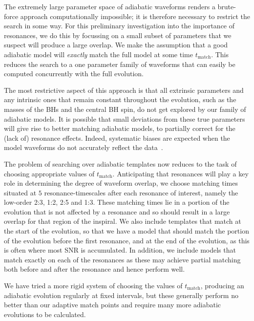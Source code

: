 \documentclass[aps,prd,amsfonts,amssymb,amsmath,nofootinbib,reprint,showpacs,superscriptaddress,twocolumn]{revtex4}
\begin{document}
The extremely large parameter space of adiabatic waveforms renders a brute-force approach computationally impossible; it is therefore necessary to restrict the search in some way. For this preliminary investigation into the importance of resonances, we do this by focussing on a small subset of parameters that we suspect will produce a large overlap. We make the assumption that a good adiabatic model will \emph{exactly} match the full model at some time $t_{\mathrm{match}}$. This reduces the search to a one parameter family of waveforms that can easily be computed concurrently with the full evolution.

The most restrictive aspect of this approach is that all extrinsic parameters and any intrinsic ones that remain constant throughout the evolution, such as the masses of the BHs and the central BH spin, do not get explored by our family of adiabatic models. It is possible that small deviations from these true parameters will give rise to better matching adiabatic models, to partially correct for the (lack of) resonance effects. Indeed, systematic biases are expected when the model waveforms do not accurately reflect the data~\cite{Cutler2007}.

The problem of searching over adiabatic templates now reduces to the task of choosing appropriate values of $t_{\mathrm{match}}$. Anticipating that resonances will play a key role in determining the degree of waveform overlap, we choose matching times situated at $5$ resonance-timescales after each resonance of interest, namely the low-order 2:3, 1:2, 2:5 and 1:3. These matching times lie in a portion of the evolution that is not affected by a resonance and so should result in a large overlap for that region of the inspiral. We also include templates that match at the start of the evolution, so that we have a model that should match the portion of the evolution before the first resonance, and at the end of the evolution, as this is often where most SNR is accumulated. In addition, we include models that match exactly on each of the resonances as these may achieve partial matching both before and after the resonance and hence perform well.

We have tried a more rigid system of choosing the values of $t_{\mathrm{match}}$, producing an adiabatic evolution regularly at fixed intervals, but these generally perform no better than our adaptive match points and require many more adiabatic evolutions to be calculated.
\end{document}
